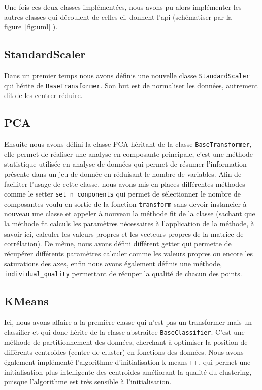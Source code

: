 \documentclass{NewTeX}
\begin{document}
    Une fois ces deux classes implémentées, nous avons pu alors implémenter les autres classes qui découlent de celles-ci, donnent l'api (schématiser par la figure~\ref{fig:uml} ).

    \subsection{StandardScaler}\label{subsec:standardscaler}
    Dans un premier temps nous avons définis une nouvelle classe \verb|StandardScaler| qui hérite de \verb|BaseTransformer|.
    Son but est de normaliser les données, autrement dit de les centrer réduire.

    \subsection{PCA}\label{subsec:pca}
    Ensuite nous avons défini la classe PCA héritant de la classe \verb|BaseTransformer|, elle permet de réaliser une analyse en composante principale, c'est une méthode statistique utilisée en analyse de données qui permet de résumer l'information présente dans un jeu de donnée en réduisant le nombre de variables.
    Afin de faciliter l'usage de cette classe, nous avons mis en places différentes méthodes comme le setter \verb|set_n_conponents| qui permet de sélectionner le nombre de composantes voulu en sortie de la fonction \verb|transform| sans devoir instancier à nouveau une classe et appeler à nouveau la méthode fit de la classe (sachant que la méthode fit calculs les paramètres nécessaires à l'application de la méthode, à savoir ici, calculer les valeurs propres et les vecteurs propres de la matrice de corrélation).
    De même, nous avons défini différent getter qui permette de récupérer différents paramètres calculer comme les valeurs propres ou encore les saturations des axes, enfin nous avons également définis une méthode, \verb|individual_quality| permettant de récuper la qualité de chacun des points.

    \subsection{KMeans}\label{subsec:kmeans}
    Ici, nous avons affaire a la première classe qui n'est pas un transformer mais un classifier et qui donc hérite de la classe abstraitee \verb|BaseClassifier|.
    C'est une méthode de partitionnement des données, cherchant à optimiser la position de différents centroides (centre de cluster) en fonctions des données.
    Nous avons également implémenté l'algorithme d'initialisation k-means++, qui permet une initialisation plus intelligente des centroides améliorant la qualité du clustering, puisque l'algorithme est très sensible à l'initialisation.
\end{document}
